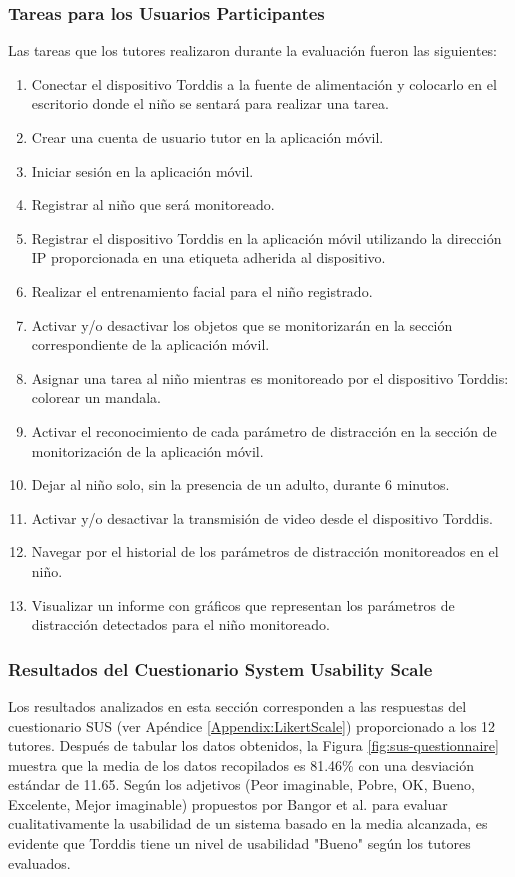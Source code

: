 \documentclass[a4paper,fleqn]{cas-sc}
\begin{document}
			\subsubsection{Tareas para los Usuarios Participantes}
				Las tareas que los tutores realizaron durante la evaluación fueron las siguientes:
				
				\begin{enumerate}
					\item Conectar el dispositivo Torddis a la fuente de alimentación y colocarlo en el escritorio donde el niño se sentará para realizar una tarea.
					\item Crear una cuenta de usuario tutor en la aplicación móvil.
					\item Iniciar sesión en la aplicación móvil.
					\item Registrar al niño que será monitoreado.
					\item Registrar el dispositivo Torddis en la aplicación móvil utilizando la dirección IP proporcionada en una etiqueta adherida al dispositivo.
					\item Realizar el entrenamiento facial para el niño registrado.
					\item Activar y/o desactivar los objetos que se monitorizarán en la sección correspondiente de la aplicación móvil.
					\item Asignar una tarea al niño mientras es monitoreado por el dispositivo Torddis: colorear un mandala.
					\item Activar el reconocimiento de cada parámetro de distracción en la sección de monitorización de la aplicación móvil.
					\item Dejar al niño solo, sin la presencia de un adulto, durante 6 minutos.
					\item Activar y/o desactivar la transmisión de video desde el dispositivo Torddis.
					\item Navegar por el historial de los parámetros de distracción monitoreados en el niño.
					\item Visualizar un informe con gráficos que representan los parámetros de distracción detectados para el niño monitoreado.
				\end{enumerate}
				
			\subsubsection{Resultados del Cuestionario System Usability Scale}
				Los resultados analizados en esta sección corresponden a las respuestas del cuestionario SUS (ver Apéndice \ref{Appendix:LikertScale}) proporcionado a los 12 tutores. Después de tabular los datos obtenidos, la Figura \ref{fig:sus-questionnaire} muestra que la media de los datos recopilados es 81.46\% con una desviación estándar de 11.65. Según los adjetivos (Peor imaginable, Pobre, OK, Bueno, Excelente, Mejor imaginable) propuestos por Bangor et al. \cite{Bangor2008AnEmpirical} para evaluar cualitativamente la usabilidad de un sistema basado en la media alcanzada, es evidente que Torddis tiene un nivel de usabilidad "Bueno" según los tutores evaluados.
				
\end{document}

